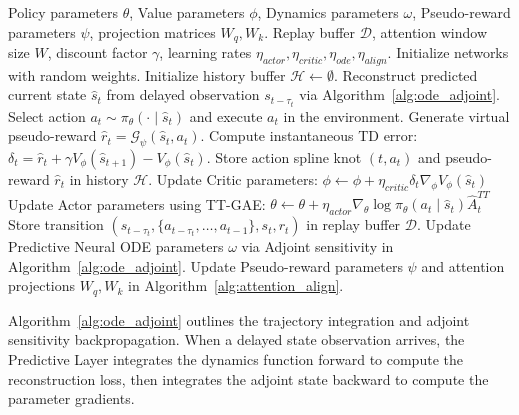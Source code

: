 \documentclass[manuscript, screen, review]{jair}
\begin{document}
\begin{algorithm}[h]
\caption{Tri-Temporal Actor-Critic (TTAC) Training Loop}
\label{alg:ttac_main}
\begin{algorithmic}[1]
\REQUIRE Policy parameters $\theta$, Value parameters $\phi$, Dynamics parameters $\omega$, Pseudo-reward parameters $\psi$, projection matrices $W_q, W_k$.
\REQUIRE Replay buffer $\mathcal{D}$, attention window size $W$, discount factor $\gamma$, learning rates $\eta_{actor}, \eta_{critic}, \eta_{ode}, \eta_{align}$.
\STATE Initialize networks with random weights.
\STATE Initialize history buffer $\mathcal{H} \leftarrow \emptyset$.
    \STATE Reconstruct predicted current state $\hat{s}_t$ from delayed observation $s_{t-\tau_t}$ via Algorithm~\ref{alg:ode_adjoint}.
    \STATE Select action $a_t \sim \pi_\theta(\cdot \mid \hat{s}_t)$ and execute $a_t$ in the environment.
    \STATE Generate virtual pseudo-reward $\hat{r}_t = \mathcal{G}_\psi(\hat{s}_t, a_t)$.
    \STATE Compute instantaneous TD error: $\delta_t = \hat{r}_t + \gamma V_\phi(\hat{s}_{t+1}) - V_\phi(\hat{s}_t)$.
    \STATE Store action spline knot $(t, a_t)$ and pseudo-reward $\hat{r}_t$ in history $\mathcal{H}$.
    \STATE Update Critic parameters:
    \STATE \quad $\phi \leftarrow \phi + \eta_{critic} \delta_t \nabla_\phi V_\phi(\hat{s}_t)$
    \STATE Update Actor parameters using TT-GAE:
    \STATE \quad $\theta \leftarrow \theta + \eta_{actor} \nabla_\theta \log \pi_\theta(a_t \mid \hat{s}_t) \hat{A}_t^{TT}$
        \STATE Store transition $(s_{t-\tau_t}, \{a_{t-\tau_t}, \dots, a_{t-1}\}, s_t, r_t)$ in replay buffer $\mathcal{D}$.
        \STATE Update Predictive Neural ODE parameters $\omega$ via Adjoint sensitivity in Algorithm~\ref{alg:ode_adjoint}.
        \STATE Update Pseudo-reward parameters $\psi$ and attention projections $W_q, W_k$ in Algorithm~\ref{alg:attention_align}.
    \ENDIF
\ENDFOR
\end{algorithmic}
\end{algorithm}

Algorithm~\ref{alg:ode_adjoint} outlines the trajectory integration and adjoint sensitivity backpropagation. When a delayed state observation arrives, the Predictive Layer integrates the dynamics function forward to compute the reconstruction loss, then integrates the adjoint state backward to compute the parameter gradients.
\end{document}
